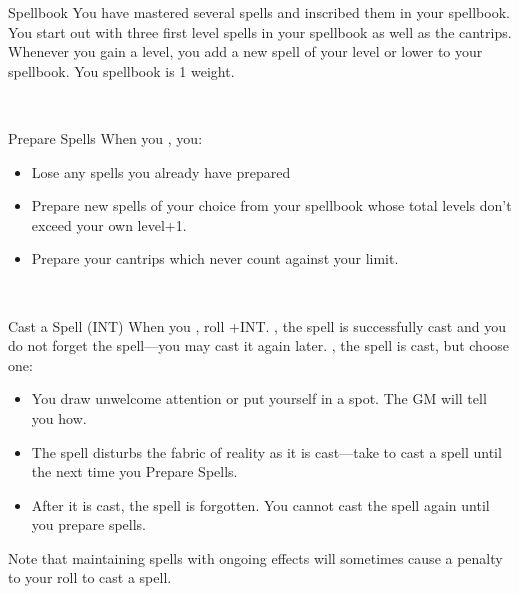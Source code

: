 \documentclass[8pt]{extarticle}
\begin{document}
\begin{minipage}[t]{4.6in}



\begin{basicmove}{Spellbook}
  You have mastered several spells and inscribed them in your
  spellbook. You start out with three first level spells in your
  spellbook as well as the cantrips. Whenever you gain a level, you
  add a new spell of your level or lower to your spellbook. You
  spellbook is 1 weight.
\end{basicmove}
\

\begin{basicmove}{Prepare Spells}
  When you , you:

  \begin{itemize}
  \item Lose any spells you already have prepared
  \item Prepare new spells of your choice from your spellbook whose
    total levels don’t exceed your own level+1.
  \item Prepare your cantrips which never count against your limit.
  \end{itemize}
\end{basicmove}
\

\begin{basicmove}{Cast a Spell (INT)}
  When you ,
  roll +INT. \onSuccess, the spell is successfully cast and you do not
  forget the spell—you may cast it again later. \onPartial, the spell
  is cast, but choose one:

  \begin{itemize}
  \item You draw unwelcome attention or put yourself in a spot. The GM
    will tell you how.
  \item The spell disturbs the fabric of reality
    as it is cast—take  to cast a spell until the next time
    you Prepare Spells.
  \item After it is cast, the spell is forgotten. You cannot cast the
    spell again until you prepare spells.
  \end{itemize}

  Note that maintaining spells with ongoing effects will sometimes
  cause a penalty to your roll to cast a spell.
\end{basicmove}
\


\end{minipage}
\end{document}
